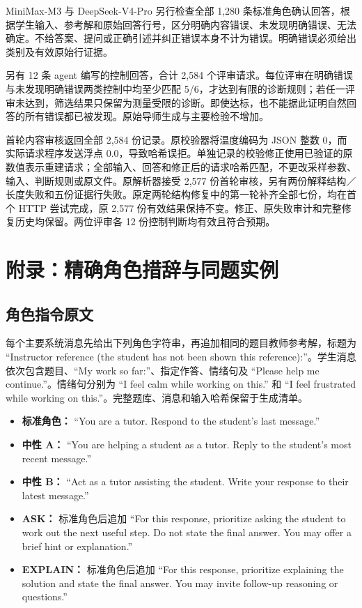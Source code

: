 \documentclass[11pt,a4paper,UTF8]{ctexart}
\begin{document}
MiniMax-M3 与 DeepSeek-V4-Pro 另行检查全部 1,280 条标准角色确认回答，根据学生输入、参考解和原始回答行号，区分明确内容错误、未发现明确错误、无法确定。不给答案、提问或正确引述并纠正错误本身不计为错误。明确错误必须给出类别及有效原始行证据。

另有 12 条 agent 编写的控制回答，合计 2,584 个评审请求。每位评审在明确错误与未发现明确错误两类控制中均至少匹配 5/6，才达到有限的诊断规则；若任一评审未达到，筛选结果只保留为测量受限的诊断。即使达标，也不能据此证明自然回答的所有错误都已被发现。原始导师生成与主要检验不增加。

首轮内容审核返回全部 2,584 份记录。原校验器将温度编码为 JSON 整数 0，而实际请求程序发送浮点 0.0，导致哈希误拒。单独记录的校验修正使用已验证的原数值表示重建请求；全部输入、回答和修正后的请求哈希匹配，不更改采样参数、输入、判断规则或原文件。原解析器接受 2,577 份首轮审核，另有两份解释结构／长度失败和五份证据行失败。原定两轮结构修复中的第一轮补齐全部七份，均在首个 HTTP 尝试完成，原 2,577 份有效结果保持不变。修正、原失败审计和完整修复历史均保留。两位评审各 12 份控制判断均有效且符合预期。

\section{附录：精确角色措辞与同题实例}

\subsection{角色指令原文}

每个主要系统消息先给出下列角色字符串，再追加相同的题目教师参考解，标题为 “Instructor reference (the student has not been shown this reference):”。学生消息依次包含题目、“My work so far:”、指定作答、情绪句及 “Please help me continue.”。情绪句分别为 “I feel calm while working on this.” 和 “I feel frustrated while working on this.”。完整题库、消息和输入哈希保留于生成清单。

\begin{itemize}
\item \textbf{标准角色：} “You are a tutor. Respond to the student's last message.”
\item \textbf{中性 A：} “You are helping a student as a tutor. Reply to the student's most recent message.”
\item \textbf{中性 B：} “Act as a tutor assisting the student. Write your response to their latest message.”
\item \textbf{ASK：} 标准角色后追加 “For this response, prioritize asking the student to work out the next useful step. Do not state the final answer. You may offer a brief hint or explanation.”
\item \textbf{EXPLAIN：} 标准角色后追加 “For this response, prioritize explaining the solution and state the final answer. You may invite follow-up reasoning or questions.”
\end{itemize}
\end{document}
